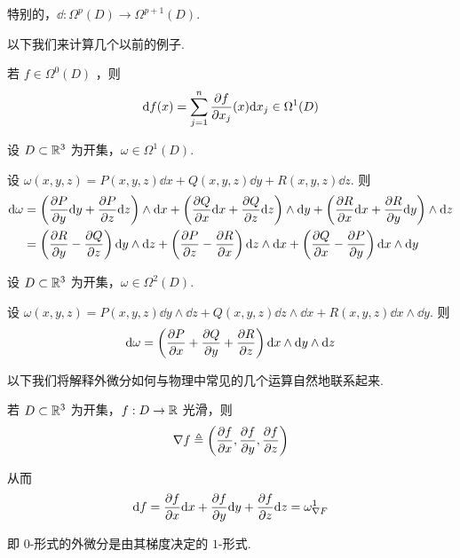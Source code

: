 特别的，$\dd:\Omega^p(D)\to\Omega^{p+1}(D)$.

以下我们来计算几个以前的例子.

\begin{example}
    若 $f\in\Omega^0(D)$ ，则
$$
\mathrm{d} f(x)=\sum_{j=1}^n\frac{\partial{f}}{\partial{x_j}}(x)\mathrm{d} x_j\in\Omega^1(D)
$$
\end{example}

\begin{example}
    设 $D\subset\mathbb{R}^3$ 为开集，$\omega\in\Omega^1(D)$.

    设 $\omega(x,y,z)=P(x,y,z)\dd x+Q(x,y,z)\dd y+R(x,y,z)\dd z$. 则
$$
\begin{aligned}
\mathrm{d}\omega&=\left(\frac{\partial{P}}{\partial{y}}\mathrm{d} y+\frac{\partial{P}}{\partial{z}}\mathrm{d} z\right)\wedge\mathrm{d} x+\left(\frac{\partial{Q}}{\partial{x}}\mathrm{d} x+\frac{\partial{Q}}{\partial{z}}\mathrm{d} z\right)\wedge\mathrm{d} y+\left(\frac{\partial{R}}{\partial{x}}\mathrm{d} x+\frac{\partial{R}}{\partial{y}}\mathrm{d} y\right)\wedge\mathrm{d} z\\
&=\left(\frac{\partial{R}}{\partial{y}}-\frac{\partial{Q}}{\partial{z}}\right)\mathrm{d} y\wedge\mathrm{d} z+\left(\frac{\partial{P}}{\partial{z}}-\frac{\partial{R}}{\partial{x}}\right)\mathrm{d} z\wedge\mathrm{d} x+\left(\frac{\partial{Q}}{\partial{x}}-\frac{\partial{P}}{\partial{y}}\right)\mathrm{d} x\wedge\mathrm{d} y
\end{aligned}
$$
\end{example}

\begin{example}
    设 $D\subset\mathbb{R}^3$ 为开集，$\omega\in\Omega^2(D)$.

    设 $\omega(x,y,z)=P(x,y,z)\dd y\wedge\dd z+Q(x,y,z)\dd z\wedge\dd x+R(x,y,z)\dd x\wedge\dd y$. 则
$$
\mathrm{d}\omega=\left(\frac{\partial{P}}{\partial{x}}+\frac{\partial{Q}}{\partial{y}}+\frac{\partial{R}}{\partial{z}}\right)\mathrm{d} x\wedge\mathrm{d} y\wedge\mathrm{d} z
$$
\end{example}

以下我们将解释外微分如何与物理中常见的几个运算自然地联系起来.

\setcounter{example}{0}
\begin{example}[ 梯度]
    若 $D\subset\mathbb{R}^3$ 为开集，$f:D\to\mathbb{R}$ 光滑，则
$$
\nabla f\triangleq\left(\frac{\partial{f}}{\partial{x}},\frac{\partial{f}}{\partial{y}},\frac{\partial{f}}{\partial{z}}\right)
$$

    从而
$$
\mathrm{d} f=\frac{\partial{f}}{\partial{x}}\mathrm{d} x+\frac{\partial{f}}{\partial{y}}\mathrm{d} y+\frac{\partial{f}}{\partial{z}}\mathrm{d} z=\omega_{\nabla F}^1
$$

    即 $0$-形式的外微分是由其梯度决定的 $1$-形式.
\end{example}

